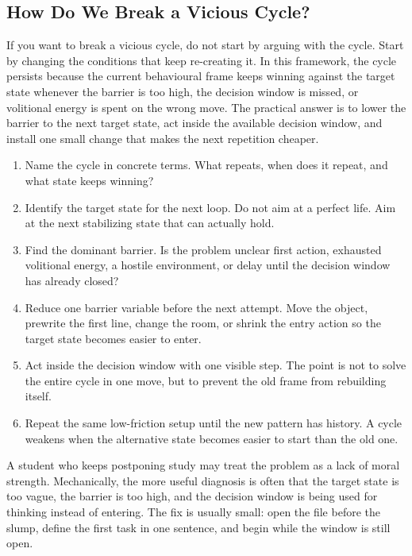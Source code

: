 \subsection{How Do We Break a Vicious Cycle?}

If you want to break a vicious cycle, do not start by arguing with the cycle.
Start by changing the conditions that keep re-creating it. In this framework,
the cycle persists because the current behavioural frame keeps winning against
the target state whenever the barrier is too high, the decision window is
missed, or volitional energy is spent on the wrong move. The practical answer
is to lower the barrier to the next target state, act inside the available
decision window, and install one small change that makes the next repetition
cheaper.

\begin{enumerate}[nosep]
  \item Name the cycle in concrete terms. What repeats, when does it repeat,
        and what state keeps winning?
  \item Identify the target state for the next loop. Do not aim at a perfect
        life. Aim at the next stabilizing state that can actually hold.
  \item Find the dominant barrier. Is the problem unclear first action,
        exhausted volitional energy, a hostile environment, or delay until the
        decision window has already closed?
  \item Reduce one barrier variable before the next attempt. Move the object,
        prewrite the first line, change the room, or shrink the entry action so
        the target state becomes easier to enter.
  \item Act inside the decision window with one visible step. The point is not
        to solve the entire cycle in one move, but to prevent the old frame from
        rebuilding itself.
  \item Repeat the same low-friction setup until the new pattern has history.
        A cycle weakens when the alternative state becomes easier to start than
        the old one.
\end{enumerate}

\begin{remark}
A student who keeps postponing study may treat the problem as a lack of moral
strength. Mechanically, the more useful diagnosis is often that the target
state is too vague, the barrier is too high, and the decision window is being
used for thinking instead of entering. The fix is usually small: open the file
before the slump, define the first task in one sentence, and begin while the
window is still open.
\end{remark}
